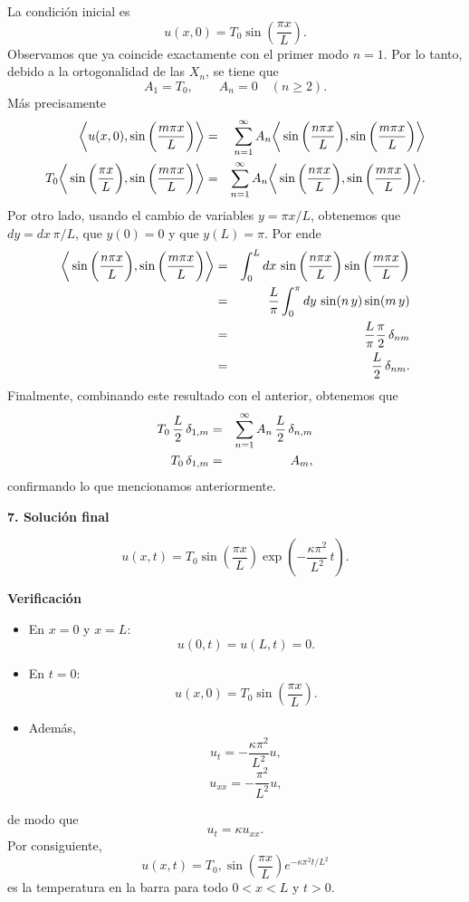 \documentclass[11pt,spanish]{article}
\begin{document}
La condición inicial es
$$
u(x,0)
=
T_0
\sin\left(\frac{\pi x}{L}\right).
$$
Observamos que ya coincide exactamente con el primer modo $n=1$.
Por lo tanto, debido a la ortogonalidad de las $X_n$, se tiene que
$$
A_1=T_0,
\qquad
A_n=0 \quad (n\ge2).
$$
M\'as precisamente
\begin{eqnarray}
\bigg\langle
u(x,0)
,
\sin
\bigg(
\frac{m \pi x}{L}
\bigg)
\bigg\rangle
&=&
\sum_{n=1}^{\infty}
A_n
\bigg\langle
\sin
\bigg(
\frac{n \pi x}{L}
\bigg)
,
\sin
\bigg(
\frac{m \pi x}{L}
\bigg)
\bigg\rangle
\notag
\\
T_0
\bigg\langle
\sin
\bigg(
\frac{\pi x}{L}
\bigg)
,
\sin
\bigg(
\frac{m \pi x}{L}
\bigg)
\bigg\rangle
&=&
\sum_{n=1}^{\infty}
A_n
\bigg\langle
\sin
\bigg(
\frac{n \pi x}{L}
\bigg)
,
\sin
\bigg(
\frac{m \pi x}{L}
\bigg)
\bigg\rangle
\notag
.
\end{eqnarray}
Por otro lado, usando el cambio de variables $y=\pi x/L$, obtenemos que $dy = dx\,\pi/L$, que $y(0)=0$ y que $y(L)=\pi$.
Por ende
\begin{eqnarray}
\bigg\langle
\sin
\bigg(
\frac{n \pi x}{L}
\bigg)
,
\sin
\bigg(
\frac{m \pi x}{L}
\bigg)
\bigg\rangle
&=&
\int_0^L
dx\,
\sin
\bigg(
\frac{n \pi x}{L}
\bigg)
\sin
\bigg(
\frac{m \pi x}{L}
\bigg)
\notag
\\
&=&
\frac{L}{\pi}
\int_0^{\pi}
dy\,
\sin(n\, y)
\sin(m\, y)
\notag
\\
&=&
\frac{L}{\pi}
\frac{\pi}{2}\,
\delta_{nm}
\notag
\\
&=&
\frac{L}{2}\,
\delta_{nm}.
\notag
\end{eqnarray}
Finalmente, combinando este resultado con el anterior, obtenemos que
\begin{eqnarray}
T_0\,
\frac{L}{2}\,
\delta_{1,m}
&=&
\sum_{n=1}^{\infty}
A_n\,
\frac{L}{2}\,
\delta_{n,m}
\notag
\\
T_0\,
\delta_{1,m}
&=&
A_m,
\notag
\end{eqnarray}
confirmando lo que mencionamos anteriormente.

{\bf 7. Solución final}

$$
\boxed{
u(x,t)
=
T_0
\sin\left(\frac{\pi x}{L}\right)
\exp\left(
-\frac{\kappa\pi^2}{L^2}\,t
\right).
}
$$

{\bf Verificación}

\begin{itemize}
\item En $x=0$ y $x=L$:
$$
u(0,t)=u(L,t)=0.
$$
\item En $t=0$:
$$
u(x,0)
=
T_0\sin\left(\frac{\pi x}{L}\right).
$$
\item Además,
$$
u_t
=
-\frac{\kappa\pi^2}{L^2}u,
$$
$$
u_{xx}
=
-\frac{\pi^2}{L^2}u,
$$
\end{itemize}
de modo que
$$
u_t=\kappa u_{xx}.
$$
Por consiguiente,
$$
\boxed{
u(x,t)=
T_0,\sin\left(\frac{\pi x}{L}\right)
e^{-\kappa\pi^2 t/L^2}
}
$$
es la temperatura en la barra para todo $0<x<L$ y $t>0$.


 
%
%
\end{document}
